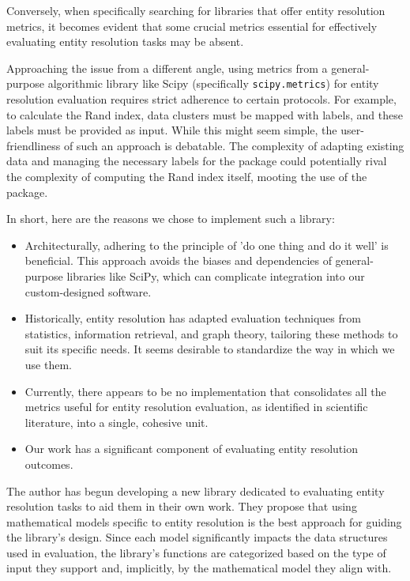 \documentclass[11pt]{article}
\begin{document}
    Conversely, when specifically searching for libraries that offer entity
    resolution metrics, it becomes evident that some crucial metrics essential
    for effectively evaluating entity resolution tasks may be
    absent\cite{ereval}.

    Approaching the issue from a different angle, using metrics from a
    general-purpose algorithmic library like Scipy (specifically
    \texttt{scipy.metrics}) for entity resolution evaluation requires strict
    adherence to certain protocols.
    For example, to calculate the Rand index, data clusters must be mapped with
    labels, and these labels must be provided as input.
    While this might seem simple, the user-friendliness of such an approach is
    debatable.
    The complexity of adapting existing data and managing the necessary labels
    for the package could potentially rival the complexity of computing the Rand
    index itself, mooting the use of the package.

    In short, here are the reasons we chose to implement such a library:
    \begin{itemize}
    \item Architecturally, adhering to the principle of 'do one thing and do
    it well' is beneficial.
    This approach avoids the biases and dependencies of general-purpose
    libraries like SciPy, which can complicate integration into our
    custom-designed software.
    \item Historically, entity resolution has adapted evaluation techniques from
    statistics, information retrieval, and graph theory, tailoring these methods
    to suit its specific needs.
    It seems desirable to standardize the way in which we use them.
    \item Currently, there appears to be no implementation that consolidates all
    the metrics useful for entity resolution evaluation, as identified in
    scientific literature, into a single, cohesive unit.
    \item Our work has a significant component of evaluating entity resolution
    outcomes.
    \end{itemize}

    The author has begun developing a new library dedicated to evaluating entity
    resolution tasks to aid them in their own work.
    They propose that using mathematical models specific to entity resolution is
    the best approach for guiding the library's design.
    Since each model significantly impacts the data structures used in
    evaluation, the library's functions are categorized based on the type of
    input they support and, implicitly, by the mathematical model they align
    with.
\end{document}
